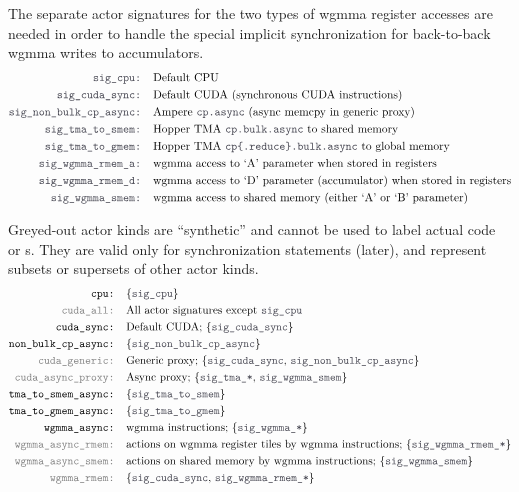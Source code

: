 \filbreak
{} The separate actor signatures for the two types of wgmma register accesses are needed in order to handle the special implicit synchronization for back-to-back wgmma writes to accumulators.
\begin{align*}
\lighttt{sig\_cpu: } & \text{Default CPU}\\
\lighttt{sig\_cuda\_sync: } & \text{Default CUDA (synchronous CUDA instructions)}\\
\lighttt{sig\_non\_bulk\_cp\_async: } & \text{Ampere \lighttt{cp.async} (async memcpy in generic proxy)}\\
\lighttt{sig\_tma\_to\_smem: } & \text{Hopper TMA \lighttt{cp.bulk.async} to shared memory}\\
\lighttt{sig\_tma\_to\_gmem: } & \text{Hopper TMA \lighttt{cp\{.reduce\}.bulk.async} to global memory}\\
\lighttt{sig\_wgmma\_rmem\_a: } & \text{wgmma access to `A' parameter when stored in registers}\\
\lighttt{sig\_wgmma\_rmem\_d: } & \text{wgmma access to `D' parameter (accumulator) when stored in registers}\\
\lighttt{sig\_wgmma\_smem: } & \text{wgmma access to shared memory (either `A' or `B' parameter)}
\end{align*}

\filbreak
{} Greyed-out actor kinds are ``synthetic'' and cannot be used to label actual code or s.
They are valid only for synchronization statements (later), and represent subsets or supersets of other actor kinds.
\begin{align*}
\texttt{cpu: } & \{\lighttt{sig\_cpu}\}\\
\graytt{cuda\_all: } & \text{All actor signatures except \lighttt{sig\_cpu}}\\
\texttt{cuda\_sync: } & \text{Default CUDA; \{\lighttt{sig\_cuda\_sync}\}}\\
\texttt{non\_bulk\_cp\_async: } & \{\lighttt{sig\_non\_bulk\_cp\_async}\}\\
\graytt{cuda\_generic: } & \text{Generic proxy; \{\lighttt{sig\_cuda\_sync}, \lighttt{sig\_non\_bulk\_cp\_async}\}}\\
\graytt{cuda\_async\_proxy: } & \text{Async proxy; \{\lighttt{sig\_tma\_*}, \lighttt{sig\_wgmma\_smem}\}}\\
\texttt{tma\_to\_smem\_async: } & \text{\{\lighttt{sig\_tma\_to\_smem}\}}\\
\texttt{tma\_to\_gmem\_async: } & \text{\{\lighttt{sig\_tma\_to\_gmem}\}}\\
\texttt{wgmma\_async: } & \text{wgmma instructions; \{\lighttt{sig\_wgmma\_*}\}}\\
\graytt{wgmma\_async\_rmem: } & \text{actions on wgmma register tiles by wgmma instructions; \{\lighttt{sig\_wgmma\_rmem\_*}\}}\\
\graytt{wgmma\_async\_smem: } & \text{actions on shared memory by wgmma instructions; \{\lighttt{sig\_wgmma\_smem}\}}\\
\graytt{wgmma\_rmem: } & \text{\{\lighttt{sig\_cuda\_sync}, \lighttt{sig\_wgmma\_rmem\_*}\}}
\end{align*}

